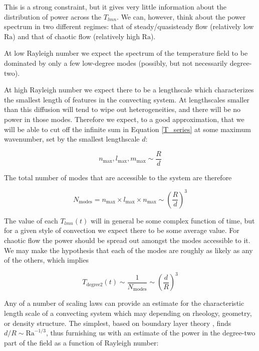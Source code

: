 \documentclass[extra,mreferee]{gji}
\begin{document}
This is a strong constraint, but it gives very little information about the distribution of power across the $T_{lmn}$.  
We can, however, think about the power spectrum in two different regimes: that of steady/quasisteady flow (relatively low $\mathrm{Ra}$) and that of chaotic flow (relatively high $\mathrm{Ra}$).

At low Rayleigh number we expect the spectrum of the temperature field to be dominated by only a few low-degree modes (possibly, but not necessarily degree-two).

At high Rayleigh number we expect there to be a lengthscale which characterizes the smallest length of features in the convecting system.  
At lengthscales smaller than this diffusion will tend to wipe out heterogeneities, and there will be no power in those modes.  
Therefore we expect, to a good approximation, that we will be able to cut off the infinite sum in Equation \ref{T_series} at some maximum wavenumber, set by the smallest lengthscale $d$:
 
\begin{equation}
n_{\mathrm{max}}, l_{\mathrm{max}}, m_{\mathrm{max}} \sim \frac{R}{d}
\end{equation}

The total number of modes that are accessible to the system are therefore 

\begin{equation}
N_{\mathrm{modes}} = n_{\mathrm{max}} \times l_{\mathrm{max}} \times n_{\mathrm{max}} \sim \left( \frac{R}{d} \right)^{3}
\end{equation}

The value of each $T_{lmn}(t)$ will in general be some complex function of time, but for a given style of convection we expect there to be some average value.
For chaotic flow the power should be spread out amongst the modes accessible to it.
We may make the hypothesis that each of the modes are roughly as likely as any of the others, which implies

\begin{equation}
T_{\mathrm{degree 2}}(t) \sim \frac{1}{N_{\mathrm{modes}}} \sim \left( \frac{d}{R}\right)^3
\end{equation}

Any of a number of scaling laws can provide an estimate for the characteristic length scale of a convecting system which may depending on rheology, geometry, or density structure.
The simplest, based on boundary layer theory \citep{turcotte1967finite}, finds $d/R \sim \mathrm{Ra}^{-1/3}$, thus furnishing us with an estimate of the power in the degree-two part of the field as a function of Rayleigh number:
\end{document}
